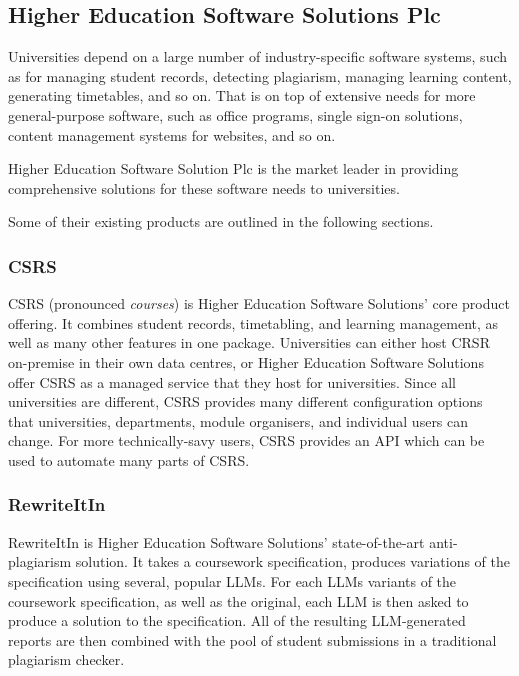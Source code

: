 
\subsection{Higher Education Software Solutions Plc}

Universities depend on a large number of industry-specific software systems, such as for managing student records, detecting plagiarism, managing learning content, generating timetables, and so on. That is on top of extensive needs for more general-purpose software, such as office programs, single sign-on solutions, content management systems for websites, and so on.

Higher Education Software Solution Plc is the market leader in providing comprehensive solutions for these software needs to universities.

Some of their existing products are outlined in the following sections.

\subsubsection{CSRS}

CSRS (pronounced \emph{courses}) is Higher Education Software Solutions' core product offering. It combines student records, timetabling, and learning management, as well as many other features in one package. Universities can either host CRSR on-premise in their own data centres, or Higher Education Software Solutions offer CSRS as a managed service that they host for universities. Since all universities are different, CSRS provides many different configuration options that universities, departments, module organisers, and individual users can change. For more technically-savy users, CSRS provides an API which can be used to automate many parts of CSRS.

\subsubsection{RewriteItIn}

RewriteItIn is Higher Education Software Solutions' state-of-the-art anti-plagiarism solution. It takes a coursework specification, produces variations of the specification using several, popular LLMs. For each LLMs variants of the coursework specification, as well as the original, each LLM is then asked to produce a solution to the specification. All of the resulting LLM-generated reports are then combined with the pool of student submissions in a traditional plagiarism checker.
